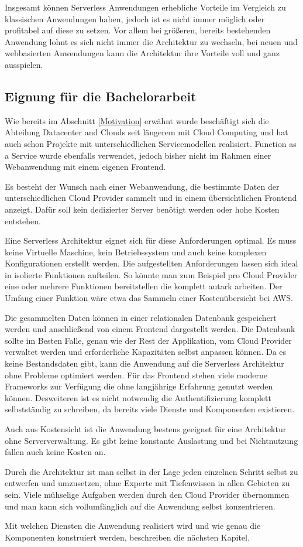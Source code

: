 Insgesamt können Serverless Anwendungen erhebliche Vorteile im Vergleich zu klassischen Anwendungen haben, jedoch
ist es nicht immer möglich oder profitabel auf diese zu setzen. Vor allem bei größeren, bereits bestehenden Anwendung lohnt es
sich nicht immer die Architektur zu wechseln, bei neuen und webbasierten Anwendungen kann
die Architektur ihre Vorteile voll und ganz ausspielen.

\subsection{Eignung für die Bachelorarbeit}
Wie bereits im Abschnitt \frqq \ref{Motivation}  \flqq{} erwähnt wurde beschäftigt sich die Abteilung Datacenter and Clouds
seit längerem mit Cloud Computing und hat auch schon Projekte mit unterschiedlichen Servicemodellen realisiert. Function as a Service wurde ebenfalls
verwendet, jedoch bisher nicht im Rahmen einer Webanwendung mit einem eigenen Frontend.

Es besteht der Wunsch nach einer Webanwendung, die bestimmte Daten der unterschiedlichen Cloud Provider sammelt und in einem übersichtlichen Frontend anzeigt.
Dafür soll kein dedizierter Server benötigt werden oder hohe Kosten entstehen.

Eine Serverless Architektur eignet sich für diese Anforderungen optimal. Es muss keine Virtuelle Maschine, kein Betriebssystem und auch keine
komplexen Konfigurationen erstellt werden. Die aufgestellten Anforderungen lassen sich ideal in isolierte Funktionen aufteilen.
So könnte man zum Beispiel pro Cloud Provider eine oder mehrere Funktionen bereitstellen die komplett autark arbeiten. Der Umfang einer Funktion
wäre etwa das Sammeln einer Kostenübersicht bei AWS.

Die gesammelten Daten können in einer relationalen Datenbank gespeichert werden und anschließend von einem Frontend dargestellt werden.
Die Datenbank sollte im Besten Falle, genau wie der Rest der Applikation, vom Cloud Provider verwaltet werden und erforderliche Kapazitäten
selbst anpassen können.
Da es keine Bestandsdaten gibt, kann die Anwendung auf die Serverless Architektur ohne Probleme optimiert werden.
Für das Frontend stehen viele moderne Frameworks zur Verfügung die ohne langjährige Erfahrung genutzt werden können. Desweiteren ist es
nicht notwendig die Authentifizierung komplett selbstständig zu schreiben, da bereits viele Dienste und Komponenten existieren.

Auch aus Kostensicht ist die Anwendung bestens geeignet für eine Architektur ohne Serververwaltung. Es gibt keine konstante Auslastung
und bei Nichtnutzung fallen auch keine Kosten an.


Durch die Architektur ist man selbst in der Lage jeden einzelnen Schritt selbst zu entwerfen und umzusetzen, ohne Experte mit Tiefenwissen
in allen Gebieten zu sein. Viele mühselige Aufgaben werden durch den Cloud Provider übernommen und man kann sich vollumfänglich auf die
Anwendung selbst konzentrieren.

Mit welchen Diensten die Anwendung realisiert wird und wie genau die Komponenten konstruiert werden, beschreiben die nächsten Kapitel.



